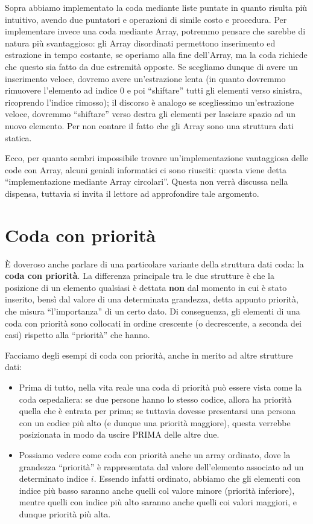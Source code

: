 \documentclass[12pt]{report}
\begin{document}
    Sopra abbiamo implementato la coda mediante liste puntate in quanto risulta più intuitivo, avendo due puntatori e operazioni di simile costo e procedura.
    Per implementare invece una coda mediante Array, potremmo pensare che sarebbe di natura più svantaggioso: gli Array disordinati permettono inserimento ed estrazione in tempo costante, se operiamo alla fine dell'Array, ma la coda richiede che questo sia fatto da due estremità opposte. Se scegliamo dunque di avere un inserimento veloce, dovremo avere un'estrazione lenta (in quanto dovremmo rimuovere l'elemento ad indice $0$ e poi ``shiftare'' tutti gli elementi verso sinistra, ricoprendo l'indice rimosso); il discorso è analogo se scegliessimo un'estrazione veloce, dovremmo ``shiftare'' verso destra gli elementi per lasciare spazio ad un nuovo elemento. Per non contare il fatto che gli Array sono una struttura dati statica.
    
    Ecco, per quanto sembri impossibile trovare un'implementazione vantaggiosa delle code con Array, alcuni geniali informatici ci sono riusciti: questa viene detta ``implementazione mediante Array circolari''. Questa non verrà discussa nella dispensa, tuttavia si invita il lettore ad approfondire tale argomento.
    
    \section{Coda con priorità}
    È doveroso anche parlare di una particolare variante della struttura dati coda: la \textbf{coda con priorità}. La differenza principale tra le due strutture è che la posizione di un elemento qualsiasi è dettata \textbf{non} dal momento in cui è stato inserito, bensì dal valore di una determinata grandezza, detta appunto priorità, che misura ``l'importanza'' di un certo dato. Di conseguenza, gli elementi di una coda con priorità sono collocati in ordine crescente (o decrescente, a seconda dei casi) rispetto alla ``priorità'' che hanno.
    
    Facciamo degli esempi di coda con priorità, anche in merito ad altre strutture dati:
    \begin{itemize}
    	\item Prima di tutto, nella vita reale una coda di priorità può essere vista come la coda ospedaliera: se due persone hanno lo stesso codice, allora ha priorità quella che è entrata per prima; se tuttavia dovesse presentarsi una persona con un codice più alto (e dunque una priorità maggiore), questa verrebbe posizionata in modo da uscire PRIMA delle altre due.
    	\item Possiamo vedere come coda con priorità anche un array ordinato, dove la grandezza ``priorità'' è rappresentata dal valore dell'elemento associato ad un determinato indice $i$. Essendo infatti ordinato, abbiamo che gli elementi con indice più basso saranno anche quelli col valore minore (priorità inferiore), mentre quelli con indice più alto saranno anche quelli coi valori maggiori, e dunque priorità più alta.
    \end{itemize}
    
\end{document}
